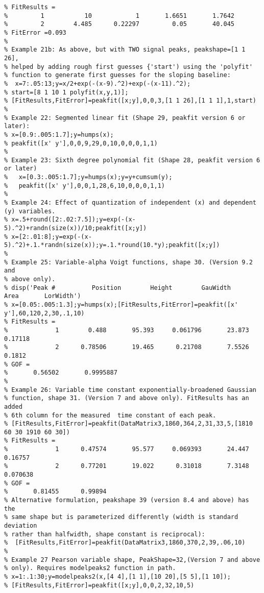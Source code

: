 \begin{lstlisting}
% FitResults =           
%         1           10            1       1.6651       1.7642
%         2        4.485      0.22297         0.05       40.045
% FitError =0.093
%
% Example 21b: As above, but with TWO signal peaks, peakshape=[1 1 26],
% helped by adding rough first guesses {'start') using the 'polyfit'
% function to generate first guesses for the sloping baseline:
%  x=7:.05:13;y=x/2+exp(-(x-9).^2)+exp(-(x-11).^2);
% start=[8 1 10 1 polyfit(x,y,1)];
% [FitResults,FitError]=peakfit([x;y],0,0,3,[1 1 26],[1 1 1],1,start)
%
% Example 22: Segmented linear fit (Shape 29, peakfit version 6 or later):
% x=[0.9:.005:1.7];y=humps(x);
% peakfit([x' y'],0,0,9,29,0,10,0,0,0,1,1)
%
% Example 23: Sixth degree polynomial fit (Shape 28, peakfit version 6 or later)
%   x=[0.3:.005:1.7];y=humps(x);y=y+cumsum(y);
%   peakfit([x' y'],0,0,1,28,6,10,0,0,0,1,1)
%
% Example 24: Effect of quantization of independent (x) and dependent (y) variables.
% x=.5+round([2:.02:7.5]);y=exp(-(x-5).^2)+randn(size(x))/10;peakfit([x;y])
% x=[2:.01:8];y=exp(-(x-5).^2)+.1.*randn(size(x));y=.1.*round(10.*y);peakfit([x;y])
%
% Example 25: Variable-alpha Voigt functions, shape 30. (Version 9.2  and
% above only). 
% disp('Peak #          Position        Height        GauWidth          Area       LorWidth')
% x=[0.05:.005:1.3];y=humps(x);[FitResults,FitError]=peakfit([x' y'],60,120,2,30,.1,10)
% FitResults =
%             1        0.488       95.393     0.061796       23.873      0.17118
%             2      0.78506       19.465      0.21708       7.5526       0.1812
% GOF =
%       0.56502       0.9995887
%
% Example 26: Variable time constant exponentially-broadened Gaussian
% function, shape 31. (Version 7 and above only). FitResults has an added
% 6th column for the measured  time constant of each peak.
% [FitResults,FitError]=peakfit(DataMatrix3,1860,364,2,31,33,5,[1810 60 30 1910 60 30])
% FitResults =
%             1      0.47574       95.577     0.069393       24.447      0.16757
%             2      0.77201       19.022      0.31018       7.3148     0.070638
% GOF =
%       0.81455      0.99894
% Alternative formulation, peakshape 39 (version 8.4 and above) has the
% same shape but is parameterized differently (width is standard deviation
% rather than halfwidth, shape constant is reciprocal):
%  [FitResults,FitError]=peakfit(DataMatrix3,1860,370,2,39,.06,10)
%
% Example 27 Pearson variable shape, PeakShape=32,(Version 7 and above
% only). Requires modelpeaks2 function in path.
% x=1:.1:30;y=modelpeaks2(x,[4 4],[1 1],[10 20],[5 5],[1 10]);
% [FitResults,FitError]=peakfit([x;y],0,0,2,32,10,5)

\end{lstlisting}
